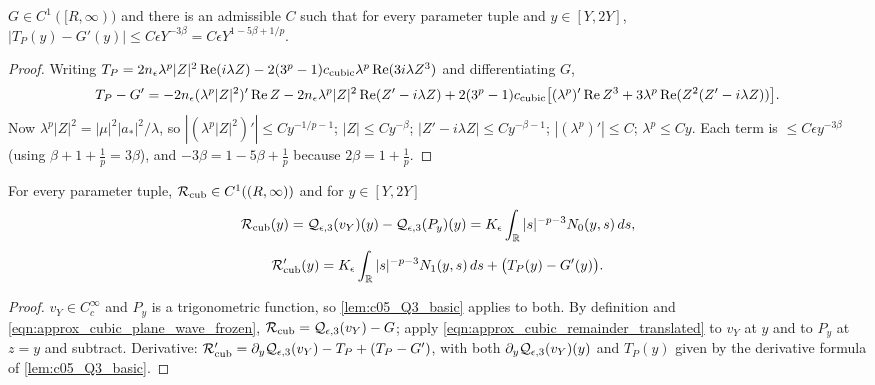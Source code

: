 \begin{lemma}
  \label{lem:c05_plane_wave_parameter}
  $G\in C^1([R,\infty))$ and there is an admissible $C$ such that for every parameter tuple and $y\in[Y,2Y]$,
  $|T_P(y)-G'(y)|\le C\epsilon Y^{-3\beta}=C\epsilon Y^{1-5\beta+1/p}$.
\end{lemma}
\begin{proof}
  Writing $T_P=2n_\epsilon\lambda^p|Z|^2\operatorname{Re}(i\lambda Z)-2(3^p-1)c_{\textup{cubic}}\lambda^p\operatorname{Re}(3i\lambda Z^3)$ and
  differentiating $G$,
  \[
    T_P-G'=-2n_\epsilon(\lambda^p|Z|^2)'\operatorname{Re}Z-2n_\epsilon\lambda^p|Z|^2\operatorname{Re}(Z'-i\lambda Z)
    +2(3^p-1)c_{\textup{cubic}}\bigl[(\lambda^p)'\operatorname{Re}Z^3+3\lambda^p\operatorname{Re}(Z^2(Z'-i\lambda Z))\bigr].
  \]
  Now $\lambda^p|Z|^2=|\mu|^2|a_*|^2/\lambda$, so $|(\lambda^p|Z|^2)'|\le Cy^{-1/p-1}$; $|Z|\le Cy^{-\beta}$; $|Z'-i\lambda Z|\le Cy^{-\beta-1}$;
  $|(\lambda^p)'|\le C$; $\lambda^p\le Cy$. Each term is $\le C\epsilon y^{-3\beta}$ (using $\beta+1+\frac1p=3\beta$), and
  $-3\beta=1-5\beta+\frac1p$ because $2\beta=1+\frac1p$.
\end{proof}

\begin{lemma}
  \label{lem:c05_cubic_remainder_representation}
  For every parameter tuple, $\mathcal{R}_{\textup{cub}}\in C^1((R,\infty))$ and for $y\in[Y,2Y]$
  \begin{equation}\label{eqn:approx_cubic_remainder_plane_wave}
    \mathcal{R}_{\textup{cub}}(y)=\mathcal{Q}_{\epsilon,3}(v_Y)(y)-\mathcal{Q}_{\epsilon,3}(P_y)(y)=K_\epsilon\int_{\mathbb{R}}|s|^{-p-3}N_0(y,s)\,ds,
  \end{equation}
  \[
    \mathcal{R}_{\textup{cub}}'(y)=K_\epsilon\int_{\mathbb{R}}|s|^{-p-3}N_1(y,s)\,ds+\bigl(T_P(y)-G'(y)\bigr).
  \]
\end{lemma}
\begin{proof}
  $v_Y\in C_c^\infty$ and $P_y$ is a trigonometric function, so \cref{lem:c05_Q3_basic} applies to both. By definition and
  \eqref{eqn:approx_cubic_plane_wave_frozen}, $\mathcal{R}_{\textup{cub}}=\mathcal{Q}_{\epsilon,3}(v_Y)-G$; apply \eqref{eqn:approx_cubic_remainder_translated}
  to $v_Y$ at $y$ and to $P_y$ at $z=y$ and subtract. Derivative: $\mathcal{R}_{\textup{cub}}'=\partial_y\mathcal{Q}_{\epsilon,3}(v_Y)-T_P+(T_P-G')$, with
  both $\partial_y\mathcal{Q}_{\epsilon,3}(v_Y)(y)$ and $T_P(y)$ given by the derivative formula of \cref{lem:c05_Q3_basic}.
\end{proof}


